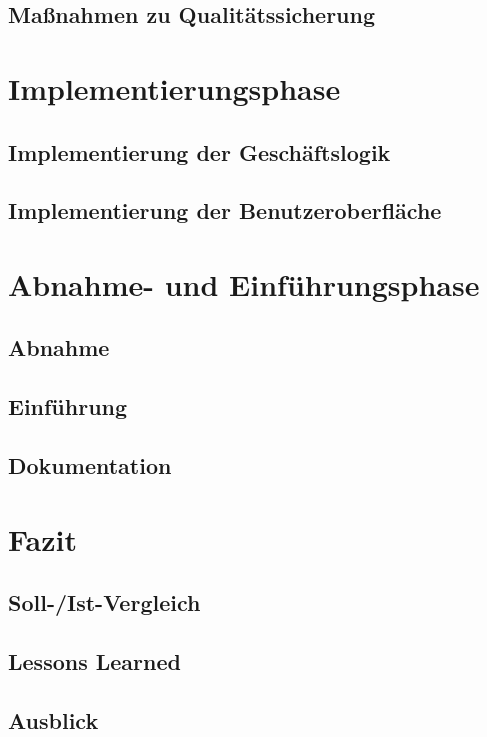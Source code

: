 \section{Maßnahmen zu Qualitätssicherung}
\paragraph{}


\chapter{Implementierungsphase}
\section{Implementierung der Geschäftslogik}
\paragraph{}


\section{Implementierung der Benutzeroberfläche}
\paragraph{}

\chapter{Abnahme- und Einführungsphase}

\section{Abnahme}
\section{Einführung}
\section{Dokumentation}

\chapter{Fazit}
\section{Soll-/Ist-Vergleich}
\section{Lessons Learned}
\section{Ausblick}
